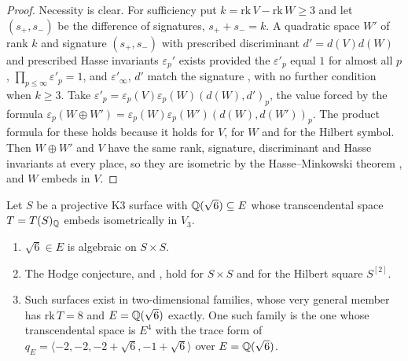 \begin{proof}
Necessity is clear. For sufficiency put $k=\mathrm{rk}\,V-\mathrm{rk}\,W\ge3$ and let $(s_{+},s_{-})$ be the difference of signatures, $s_{+}+s_{-}=k$. A quadratic space $W'$ of rank $k$ and signature $(s_{+},s_{-})$ with prescribed discriminant $d'=d(V)d(W)$ and prescribed Hasse invariants $\varepsilon_{p}'$ exists provided the $\varepsilon'_{p}$ equal $1$ for almost all $p$, $\prod_{p\le\infty}\varepsilon'_{p}=1$, and $\varepsilon'_{\infty}$, $d'$ match the signature \cite[Chap.~IV, Prop.~7]{Ser73}, with no further condition when $k\ge3$. Take $\varepsilon'_{p}=\varepsilon_{p}(V)\varepsilon_{p}(W)(d(W),d')_{p}$, the value forced by the formula $\varepsilon_{p}(W\oplus W')=\varepsilon_{p}(W)\varepsilon_{p}(W')(d(W),d(W'))_{p}$. The product formula for these holds because it holds for $V$, for $W$ and for the Hilbert symbol. Then $W\oplus W'$ and $V$ have the same rank, signature, discriminant and Hasse invariants at every place, so they are isometric by the Hasse--Minkowski theorem \cite[Chap.~IV, Thm.~9]{Ser73}, and $W$ embeds in $V$.
\end{proof}

\begin{theorem}\label{thm:sqrt6}
Let $S$ be a projective K3 surface with $\mathbb{Q}(\sqrt6)\subseteq E$ whose transcendental space $T=T(S)_{\mathbb{Q}}$ embeds isometrically in $V_{3}$.
\begin{enumerate}[label=\textup{(\roman*)},leftmargin=2.4em,itemsep=2pt]
\item $\sqrt6\in E$ is algebraic on $S\times S$.
\item The Hodge conjecture, and \Fiii{}, hold for $S\times S$ and for the Hilbert square $S^{[2]}$.
\item Such surfaces exist in two-dimensional families, whose very general member has $\mathrm{rk}\,T=8$ and $E=\mathbb{Q}(\sqrt6)$ exactly. One such family is the one whose transcendental space is $E^{4}$ with the trace form of $q_{E}=\langle-2,-2,-2+\sqrt6,-1+\sqrt6\rangle$ over $E=\mathbb{Q}(\sqrt6)$.
\end{enumerate}
\end{theorem}

